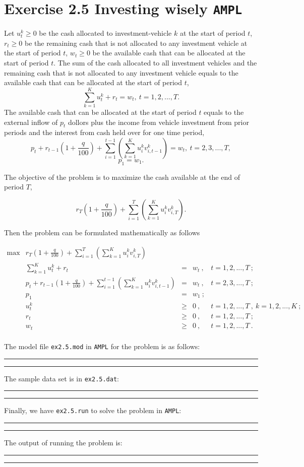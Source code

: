 \section{Exercise 2.5 Investing wisely {\tt AMPL}}

Let $u_{t}^k \geq 0$ be the cash allocated to investment-vehicle $k$ at the start of period $t$, $r_{t} \geq 0$ be the remaining cash that is not allocated to any investment vehicle at the start of period $t$, $w_{t} \geq 0$ be the available cash that can be allocated at the start of period $t$. The sum of the cash allocated to all investment vehicles and the remaining cash that is not allocated to any investment vehicle equals to the available cash that can be allocated at the start of period $t$, $$ \sum_{k=1}^{K} u_{t}^k + r_t = w_t,~t=1,2,...,T.$$ The available cash that can be allocated at the start of period $t$ equals to the external inflow of $p_t$ dollors plus the income from vehicle investment from prior periods and the interest from cash held over for one time period, $$p_t + r_{t-1} (1+\frac{q}{100}) + \sum_{i=1}^{t-1}\left(\sum_{k=1}^K u_{i}^kv_{i,t-1}^k\right) = w_t,~t=2,3,...,T,$$ $$p_1 = w_1.$$

The objective of the problem is to maximize the cash available at the end of period $T$,

$$r_{T} (1+\frac{q}{100}) + \sum_{i=1}^{T}\left(\sum_{k=1}^K u_{i}^kv_{i,T}^k\right).$$

Then the problem can be formulated mathematically as follows

\[
\begin{array}{rrcll}
 \max & r_{T} (1+\frac{q}{100}) + \sum_{i=1}^{T}\left(\sum_{k=1}^K u_{i}^kv_{i,T}^k\right)  &  &   & \\
      &  \sum_{k=1}^{K} u_{t}^k + r_t & = & w_t~,  &t=1,2,...,T~; \\
      &  p_t + r_{t-1} (1+\frac{q}{100}) + \sum_{i=1}^{t-1}\left(\sum_{k=1}^K u_{i}^kv_{i,t-1}^k\right) & = & w_t~,& t=2,3,...,T~;\\
      &  p_1  & = & w_1~; & \\
      &  u_{t}^k & \geq & 0~, & t = 1,2,...,T~,~k=1,2,...,K~;\\
      &  r_t & \geq & 0~, & t = 1,2,...,T~; \\
      &  w_t & \geq & 0~, & t = 1,2,...,T~.\\
\end{array}
\]

The model file {\tt ex2.5.mod} in {\tt AMPL} for the problem is as follows:

\bigskip
\hrule
\small

\normalsize
\hrule
\bigskip

The sample data set is in {\tt ex2.5.dat}:

\bigskip
\hrule
\small

\normalsize
\hrule
\bigskip

Finally, we have {\tt ex2.5.run} to solve the problem in {\tt AMPL}:

\bigskip
\hrule
\small

\normalsize
\hrule
\bigskip

The output of running the problem is:

\bigskip
\hrule
\small

\normalsize
\hrule
\bigskip

